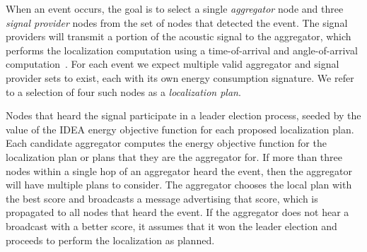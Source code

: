 When an event occurs, the goal is to select a single \textit{aggregator} node
and three \textit{signal provider} nodes from the set of nodes that detected
the event. The signal providers will transmit a portion of the acoustic
signal to the aggregator, which performs the localization computation using a
time-of-arrival and angle-of-arrival computation~\cite{Niculescu03adhoc}.
For each event we expect multiple valid aggregator and signal provider sets
to exist, each with its own energy consumption signature. We refer to a
selection of four such nodes as a \textit{localization plan}. 

Nodes that heard the signal participate in a leader election process, seeded
by the value of the IDEA energy objective function for each proposed
localization plan. Each candidate aggregator computes the energy objective
function for the localization plan or plans that they are the aggregator for.
If more than three nodes within a single hop of an aggregator heard the
event, then the aggregator will have multiple plans to consider. The
aggregator chooses the local plan with the best score and broadcasts a
message advertising that score, which is propagated to all nodes that heard
the event. If the aggregator does not hear a broadcast with a better score,
it assumes that it won the leader election and proceeds to perform the
localization as planned. 
